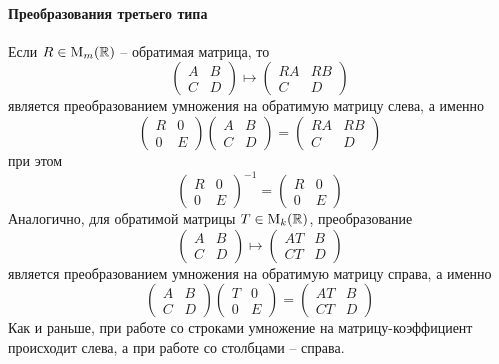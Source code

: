 \paragraph{Преобразования третьего типа}

Если $R\in \operatorname{M}_{m}(\mathbb R)$ -- обратимая матрица, то
\[
\begin{pmatrix}
{A}&{B}\\
{C}&{D}
\end{pmatrix}
\mapsto
\begin{pmatrix}
{RA}&{RB}\\
{C}&{D}
\end{pmatrix}
\]
является преобразованием умножения на обратимую матрицу слева, а именно
\[
\begin{pmatrix}
{R}&{0}\\
{0}&{E}
\end{pmatrix}
\begin{pmatrix}
{A}&{B}\\
{C}&{D}
\end{pmatrix}
=
\begin{pmatrix}
{RA}&{RB}\\
{C}&{D}
\end{pmatrix}
\]
при этом
\[
\begin{pmatrix}
{R}&{0}\\
{0}&{E}
\end{pmatrix}^{-1}
=
\begin{pmatrix}
{R}&{0}\\
{0}&{E}
\end{pmatrix}
\]
Аналогично, для обратимой матрицы $T\in\operatorname{M}_{k}(\mathbb R)$, преобразование
\[
\begin{pmatrix}
{A}&{B}\\
{C}&{D}
\end{pmatrix}
\mapsto
\begin{pmatrix}
{AT}&{B}\\
{CT}&{D}
\end{pmatrix}
\]
является преобразованием умножения на обратимую матрицу справа, а именно
\[
\begin{pmatrix}
{A}&{B}\\
{C}&{D}
\end{pmatrix}
\begin{pmatrix}
{T}&{0}\\
{0}&{E}
\end{pmatrix}
=
\begin{pmatrix}
{AT}&{B}\\
{CT}&{D}
\end{pmatrix}
\]
Как и раньше, при работе со строками умножение на матрицу-коэффициент происходит слева, а при работе со столбцами -- справа.

